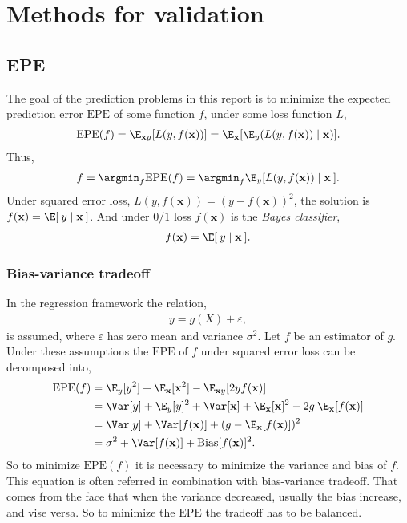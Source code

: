 \chapter{Methods for validation}
\label{chap:Metods for validation}
\section{EPE}
\label{sec:EPE}
The goal of the prediction problems in this report is to minimize the expected prediction error $\mathrm{EPE}$ of some function $f$, under some loss function $L$,
\begin{align}
  \mathrm{EPE}(f) = \E_{\mathbf{x} y}[L(y, f(\mathbf{x}))] = \E_{\mathbf{x}} [\E_y (L(y, f(\mathbf{x})) \mid \mathbf{x})].
\end{align}
Thus,
\begin{align}
  f = \argmin_{f} \mathrm{EPE}(f) = \argmin_{ f} \E_y [L(y, f(\mathbf{x})) \mid \mathbf{x}\: ].
\end{align}
Under squared error loss, $L(y, f(\mathbf{x})) = (y- f(\mathbf{x}))^2$, the solution is 
$ f(\mathbf{x}) = \E[\:y \mid \mathbf{x}\:]$. And under $0/1$ loss $ f(\mathbf{x})$ is the \textit{Bayes classifier},
\begin{align}
  f(\mathbf{x}) = \E[\: y \mid \mathbf{x} \:].
\end{align}

\subsection{Bias-variance tradeoff}
\label{sub:Bias-variance tradeoff}
In the regression framework the relation,
\begin{align}
  y = g(X) + \varepsilon,  
\end{align}
is assumed, where $\varepsilon$ has zero mean and variance $\sigma^2$. Let $f$ be an estimator of $g$.
Under these assumptions the $\mathrm{EPE}$ of $f$ under squared error loss can be decomposed into,
\begin{align}
  \mathrm{EPE}(f) &=  \E_y[y^2] + \E_\mathbf{x}[\mathbf{x}^2] - \E_{\mathbf{x} y}[2 y f(\mathbf{x})] \notag \\
                       &= \Var[y] + \E_y[y]^2 + \Var[\mathbf{x}] + \E_\mathbf{x}[\mathbf{x}]^2 - 2 g\: \E_\mathbf{x}[f(\mathbf{x})] \notag \\
                       &= \Var[y] + \Var[ f(\mathbf{x})] + (g - \E_\mathbf{x}[ f(\mathbf{x})])^2 \notag \\
                       &= \sigma^2 + \Var[ f(\mathbf{x})] + \mathrm{Bias}[f(\mathbf{x})]^2.
\end{align}
So to minimize $\mathrm{EPE}(f)$ it is necessary to minimize the variance and bias of $f$. This equation is often referred in combination with bias-variance tradeoff. That comes from the face that when the variance decreased, usually the bias increase, and vise versa. So to minimize the $\mathrm{EPE}$ the tradeoff has to be balanced. 


